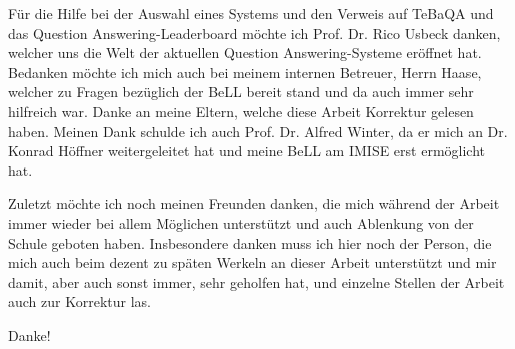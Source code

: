 Für die Hilfe bei der Auswahl eines Systems und den Verweis auf TeBaQA und das Question Answering-Leaderboard möchte ich Prof. Dr. Rico Usbeck danken, welcher uns die Welt der aktuellen Question Answering-Systeme eröffnet hat.
Bedanken möchte ich mich auch bei meinem internen Betreuer, Herrn Haase, welcher zu Fragen bezüglich der BeLL bereit stand und da auch immer sehr hilfreich war.
Danke an meine Eltern, welche diese Arbeit Korrektur gelesen haben.
Meinen Dank schulde ich auch Prof. Dr. Alfred Winter, da er mich an Dr. Konrad Höffner weitergeleitet hat und meine BeLL am IMISE erst ermöglicht hat.

Zuletzt möchte ich noch meinen Freunden danken, die mich während der Arbeit immer wieder bei allem Möglichen unterstützt und auch Ablenkung von der Schule geboten haben.
Insbesondere danken muss ich hier noch der Person, die mich auch beim dezent zu späten Werkeln an dieser Arbeit unterstützt und mir damit, aber auch sonst immer, sehr geholfen hat,
und einzelne Stellen der Arbeit auch zur Korrektur las.

Danke!

\endgroup
